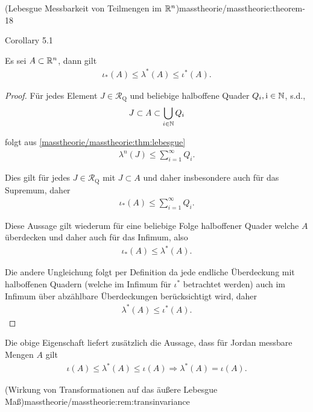 \begin{theorem}{(Lebesgue Messbarkeit von Teilmengen im \protect\(\mathbb{R}^n\protect\))}{masstheorie/masstheorie:theorem-18}
\begin{emphBox}{}{}{Corollary 5.1}
\par
Es sei \(A\subset\mathbb{R}^n\), dann gilt
\begin{align*}
\iota_\ast(A) \leq \lambda^\ast(A) \leq \iota^\ast(A).
\end{align*}\end{emphBox}

\begin{proof}
 Für jedes Element \(J\in\mathcal{R}_{\text{Q}}\) und beliebige halboffene Quader \(Q_i,\mathrm{i}\in\mathbb{N}\), s.d.,
\begin{align*}
J\subset A\subset \bigcup_{i\in\mathbb{N}} Q_i
\end{align*}
\par
folgt aus \cref{masstheorie/masstheorie:thm:lebesgue} \begin{align*}
\lambda^n(J)\leq \sum_{i=1}^\infty Q_i.
\end{align*}
\par
Dies gilt für jedes \(J\in \mathcal{R}_{\text{Q}}\) mit \(J\subset A\) und daher insbesondere auch für das Supremum, daher
\begin{align*}
\iota_\ast(A) \leq \sum_{i=1}^\infty Q_i.
\end{align*}
\par
Diese Aussage gilt wiederum für eine beliebige Folge halboffener Quader welche \(A\) überdecken und daher auch für das Infimum, also
\begin{align*}
\iota_\ast(A) \leq \lambda^\ast(A).
\end{align*}
\par
Die andere Ungleichung folgt per Definition da jede endliche Überdeckung mit halboffenen Quadern (welche im Infimum für \(\iota^\ast\) betrachtet werden) auch im Infimum über abzählbare Überdeckungen berücksichtigt wird, daher
\begin{align*}
\lambda^\ast(A)\leq\iota^\ast(A).
\end{align*}\end{proof}

\par
Die obige Eigenschaft liefert zusätzlich die Aussage, dass für Jordan messbare Mengen \(A\) gilt
\begin{align*}
\iota(A)\leq\lambda^\ast(A)\leq\iota(A)\Rightarrow \lambda^\ast(A) = \iota(A).
\end{align*}\begin{remark}{(Wirkung von Transformationen auf das äußere Lebesgue Maß)}{masstheorie/masstheorie:rem:transinvariance}




\end{remark}
\end{theorem}
